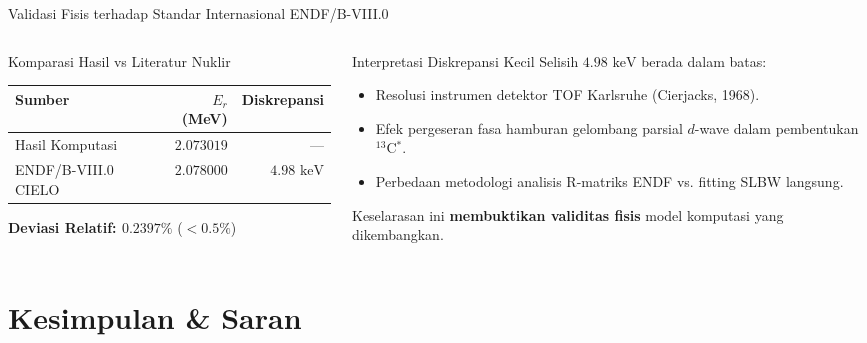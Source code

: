 \documentclass[aspectratio=169, 10pt]{beamer}
\begin{document}
\begin{frame}{Validasi Fisis terhadap Standar Internasional ENDF/B-VIII.0}
	\begin{columns}[T]
		\begin{column}{0.5\textwidth}
			\begin{exampleblock}{Komparasi Hasil vs Literatur Nuklir}
				\small
				\begin{table}
					\footnotesize
					\setlength{\tabcolsep}{4pt}
					\begin{tabular}{l r r}
						\toprule
						\textbf{Sumber} & $E_r$ (MeV) & Diskrepansi \\
						\midrule
						Hasil Komputasi & $2.073019$ & --- \\
						ENDF/B-VIII.0 CIELO & $2.078000$ & $4.98\text{ keV}$ \\
						\bottomrule
					\end{tabular}
				\end{table}
				\vspace{0.2cm}
				\textbf{Deviasi Relatif: $0.2397\%$} ($< 0.5\%$)
			\end{exampleblock}
		\end{column}

		\begin{column}{0.5\textwidth}
			\begin{block}{Interpretasi Diskrepansi Kecil}
				\small
				Selisih $4.98\text{ keV}$ berada dalam batas:
				\begin{itemize}
					\item Resolusi instrumen detektor TOF Karlsruhe (Cierjacks, 1968).
					\item Efek pergeseran fasa hamburan gelombang parsial $d$-wave dalam pembentukan $^{13}$C$^*$.
					\item Perbedaan metodologi analisis R-matriks ENDF vs. fitting SLBW langsung.
				\end{itemize}
				\footnotesize
				Keselarasan ini \textbf{membuktikan validitas fisis} model komputasi yang dikembangkan.
			\end{block}
		\end{column}
	\end{columns}
\end{frame}


\section{Kesimpulan \& Saran}
\end{document}
